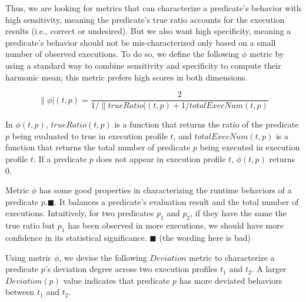 


Thus, we are looking for metrics that can characterize
a predicate's behavior with high sensitivity, meaning the predicate's true
ratio accounts for the execution results (i.e., correct or undesired).
But we also want
high specificity, meaning a predicate's behavior should not be
mis-characterized only based on a small number of
observed executions. To do so, we define the following
$\phi$ metric by using a standard way to
combine sensitivity and specificity to compute their
harmonic mean; this metric prefers high scores in both dimensions. 

\vspace{-3mm}

{\small{
\[
\|\phi|(t, p) = \frac{2}{{1}/{\|trueRatio|(t, p)} + {1}/{totalExecNum(t, p)}}
\]
}}

\vspace{-3mm}

In $\phi(t, p)$, $trueRatio(t, p)$ is a function that returns the ratio of the predicate $p$ being
evaluated to true in execution profile $t$, and $totalExecNum(t, p)$ is a function
that returns the total number of predicate $p$ being executed in execution profile $t$. If a predicate $p$ does not appear in execution profile $t$,
$\phi(t, p)$ returns 0.

Metric $\phi$ has some good properties in characterizing the
runtime behaviors of a predicate $p$.$\blacksquare$.
It balances a predicate's evaluation result and the total number of executions.
Intuitively, for two predicates $p_1$ and $p_2$, if they have the same
the true ratio but $p_1$ has been observed in more executions, we
should have more confidence in its statistical significance. $\blacksquare$
(the wording here is bad)

Using metric $\phi$, we devise the following $Deviation$ metric
to characterize a predicate $p$'s deviation degree across two execution
profiles $t_1$ and $t_2$. A larger $Deviation(p)$ value indicates that
predicate $p$ has more deviated behaviors between $t_1$ and $t_2$.

\vspace{-2mm}

